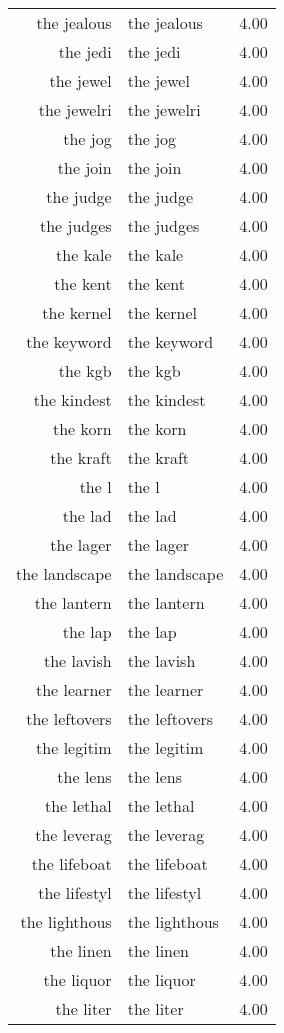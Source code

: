\begin{table}[ht]
\begin{tabular}{rlr}
  the jealous & the jealous & 4.00 \\ 
  the jedi & the jedi & 4.00 \\ 
  the jewel & the jewel & 4.00 \\ 
  the jewelri & the jewelri & 4.00 \\ 
  the jog & the jog & 4.00 \\ 
  the join & the join & 4.00 \\ 
  the judge & the judge & 4.00 \\ 
  the judges & the judges & 4.00 \\ 
  the kale & the kale & 4.00 \\ 
  the kent & the kent & 4.00 \\ 
  the kernel & the kernel & 4.00 \\ 
  the keyword & the keyword & 4.00 \\ 
  the kgb & the kgb & 4.00 \\ 
  the kindest & the kindest & 4.00 \\ 
  the korn & the korn & 4.00 \\ 
  the kraft & the kraft & 4.00 \\ 
  the l & the l & 4.00 \\ 
  the lad & the lad & 4.00 \\ 
  the lager & the lager & 4.00 \\ 
  the landscape & the landscape & 4.00 \\ 
  the lantern & the lantern & 4.00 \\ 
  the lap & the lap & 4.00 \\ 
  the lavish & the lavish & 4.00 \\ 
  the learner & the learner & 4.00 \\ 
  the leftovers & the leftovers & 4.00 \\ 
  the legitim & the legitim & 4.00 \\ 
  the lens & the lens & 4.00 \\ 
  the lethal & the lethal & 4.00 \\ 
  the leverag & the leverag & 4.00 \\ 
  the lifeboat & the lifeboat & 4.00 \\ 
  the lifestyl & the lifestyl & 4.00 \\ 
  the lighthous & the lighthous & 4.00 \\ 
  the linen & the linen & 4.00 \\ 
  the liquor & the liquor & 4.00 \\ 
  the liter & the liter & 4.00 \\ 

\end{tabular}
\end{table}
